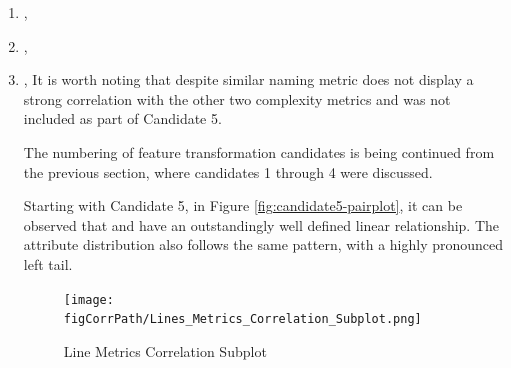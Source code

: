 \begin{enumerate}
\begin{itemize}
    \item \overallBranchCoverage{}
    \item \overallUncoveredLines{}
    \item \overallCoverage{}
    \item \overallUncoveredConditions{}
\end{itemize}

The remaining attributes have been removed from the data frame and conversely, any further analysis.

\paragraph{Line and complexity features}\label{sec:impl-data-analysis:corr:line-and-complexity}
In the following section, a number off attributes has been investigated with regards to the possibility of transforming said features and reducing the dimensionality of the overall dataset. Given a subplot of a heatmap presented in Figure \ref{fig:correlation-line-metrics-subplot} the attributes under analysis are, based on their high correlation:
    \item \complexity{}, \fileComplexity{}    \item \statements{}, \linesToCover{}
    \item \ncloc{}, \lines{}
It is worth noting that despite similar naming \functionComplexity{} metric does not display a strong correlation with the other two complexity metrics and was not included  as part of Candidate 5.

The numbering of feature transformation candidates is being continued from the previous section, where candidates 1 through 4 were discussed.

Starting with Candidate 5, in Figure \ref{fig:candidate5-pairplot}, it can be observed that \complexity{} and \fileComplexity{} have an outstandingly well defined linear relationship. The attribute distribution also follows the same pattern, with a highly pronounced left tail. 

\begin{figure}
    \centering
    \texttt{[image: \\figCorrPath/Lines\_Metrics\_Correlation\_Subplot.png]}
    \caption{Line Metrics Correlation Subplot}
    \label{fig:correlation-line-metrics-subplot}
\end{figure}


\end{enumerate}
